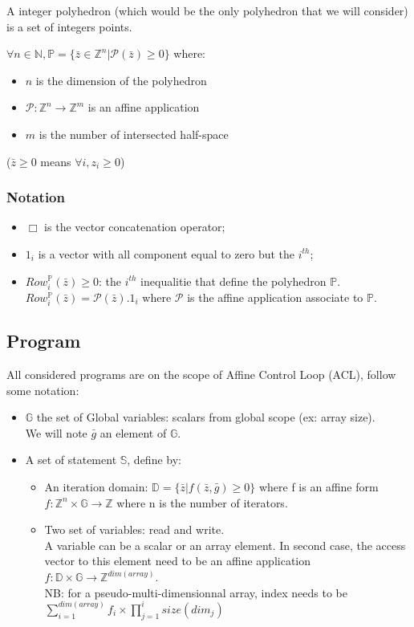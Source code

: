 A integer polyhedron (which would be the only polyhedron that we will consider) is a set of integers points.

$\forall n \in \mathbb{N}, \mathbb{P} = \{\bar{z} \in \mathbb{Z}^{n} | \mathcal{P}(\bar{z}) \geq 0 \}$ where:
\begin{itemize}
	\item $n$ is the dimension of the polyhedron
	\item $\mathcal{P}: \mathbb{Z}^{n} \rightarrow \mathbb{Z}^{m}$ is an affine application
	\item $m$ is the number of intersected half-space
\end{itemize}
($\bar{z} \geq 0$ means $\forall i, z_{i} \geq 0$)

			\subsubsection{Notation}
			\label{polyhedric:maths:defs:notation}

\begin{itemize}
	\item $ \Box $ is the vector concatenation operator;
	\item $ 1_{i} $ is a vector with all component equal to zero but the $i^{th}$;
	\item $ Row_{i}^{\mathbb{P}}(\bar{z}) \geq 0 $: the $i^{th}$ inequalitie that define the polyhedron $\mathbb{P}$.\\
	$Row_{i}^{\mathbb{P}}(\bar{z}) = \mathcal{P}(\bar{z}).1_{i}$ where $\mathcal{P}$ is the affine application associate
	to $\mathbb{P}$.
\end{itemize}
		\subsection{Program}
		\label{polyhedric:maths:}

All considered programs are on the scope of Affine Control Loop (ACL), follow some notation:
\begin{itemize}
	\item $\mathbb{G}$ the set of Global variables: scalars from global scope (ex: array size).\\
	We will note $\bar{g}$ an element of $\mathbb{G}$.
	\item A set of statement $\mathbb{S}$, define by:
	\begin{itemize}
		\item An iteration domain: $\mathbb{D} = \{\bar{z} | f(\bar{z}, \bar{g}) \geq 0\}$ where f is an affine
				form $f: \mathbb{Z}^{n} \times \mathbb{G} \rightarrow \mathbb{Z}$ where n is the number
				of iterators.
		\item Two set of variables: read and write.\\
		A variable can be a scalar or an array element. In second case, the access vector to this element need to
		be an affine application $f: \mathbb{D} \times \mathbb{G} \rightarrow \mathbb{Z}^{dim(array)}$.\\
		NB: for a pseudo-multi-dimensionnal array, index needs to be 
		$\sum_{i=1}^{dim(array)} f_{i} \times \prod_{j=1}^{i} size(dim_{j})$
	\end{itemize}
\end{itemize}

